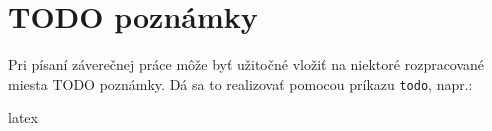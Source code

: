 \section{TODO poznámky}

Pri písaní záverečnej práce môže byť užitočné vložiť na niektoré rozpracované miesta TODO poznámky. Dá sa to realizovať pomocou príkazu \texttt{todo}, napr.:
\begin{inlinecode}{latex}
\end{inlinecode}

